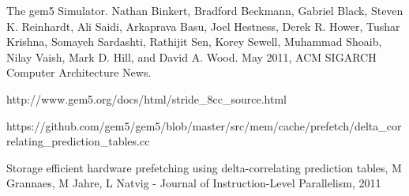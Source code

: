 \documentclass[twoside]{iitbreport}
\begin{document}
\begin{thebibliography}{99}
The gem5 Simulator. Nathan Binkert, Bradford Beckmann, Gabriel Black, Steven K. Reinhardt, Ali Saidi, Arkaprava Basu, Joel Hestness, Derek R. Hower, Tushar Krishna, Somayeh Sardashti, Rathijit Sen, Korey Sewell, Muhammad Shoaib, Nilay Vaish, Mark D. Hill, and David A. Wood. May 2011, ACM SIGARCH Computer Architecture News.

http://www.gem5.org/docs/html/stride\_8cc\_source.html

https://github.com/gem5/gem5/blob/master/src/mem/cache/prefetch/delta\_correlating\_prediction\_tables.cc

Storage efficient hardware prefetching using delta-correlating prediction tables, M Grannaes, M Jahre, L Natvig - Journal of Instruction-Level Parallelism, 2011
\end{thebibliography}

%

%

\end{document}
